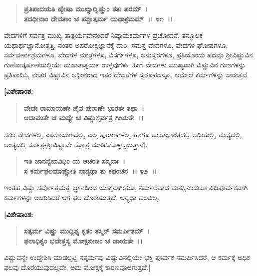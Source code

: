\begin{verse}
\textbf{ಪ್ರತಿಪಾದಯತಿ ಹ್ಯೇಷಾ ಮುಖ್ಯಾದ್ವಿಷ್ಣುಂ ತತಃ ಪರಮ್~।}\\\textbf{ತದಧೀನಾಂ ದೇವತಾಂ ಚ ಪಶ್ಚಾತ್ಕರ್ಮ ಯಥಾಕ್ರಮಮ್~।। ೪೧~।।}
\end{verse}

ವೇದಗಳಿಗೆ ಸರ್ವತ್ರ ಮುಖ್ಯ ತಾತ್ಪರ್ಯವೇನೆಂದರೆ ನಿಷ್ಕಾಮಕರ್ಮಗಳ ಪ್ರಚೋದನೆ, ತನ್ಮೂಲಕ ಯಥಾರ್ಥಜ್ಞಾನೋತ್ಪತ್ತಿ, ನಂತರ ಅಪರೋಕ್ಷಜ್ಞಾನಕ್ಕೆ ದಾರಿ; ಸಮಸ್ತ ವೇದಗಳೂ, ವೇದಗಳ ಘೋಷಗಳೂ, ಸರ್ವವರ್ಣಾಶ್ರಮಗಳೂ, ವೇದಗಳ ಮಾತ್ರೆಗಳೂ, ವಿಸರ್ಗಗಳೂ, ಅನುಸ್ವರಗಳೂ, ಪ್ರತಿಯೊಂದು ಪದವೂ ಶ‍್ರೀವಿಷ್ಣುವಿನ ಗುಣೋತ್ಕರ್ಷಣೆಯಲ್ಲಿಯೇ ಮಹಾತಾತ್ಪರ್ಯ ಉಳ್ಳವುಗಳು. ಹೀಗೆ ವೇದಗಳು ಮುಖ್ಯವಾಗಿ ವಿಷ್ಣುವಿನ ಗುಣಗಳನ್ನು ಪ್ರತಿಪಾದಿಸಿ, ನಂತರ ವಿಷ್ಣುವಿನ ಅಧೀನರಾದ ಇತರ ದೇವತೆಗಳ ಸ್ವರೂಪವನ್ನೂ, ಆಮೇಲೆ ಕರ್ಮಗಳನ್ನು ಸಾರುತ್ತವೆ.

\begin{flushleft}
\textbf{[ವಿಶೇಷಾಂಶ: }
\end{flushleft}

\begin{verse}
\textbf{ವೇದೇ ರಾಮಾಯಣೇ ಚೈವ ಪುರಾಣೇ ಭಾರತೇ ತಥಾ~।}\\\textbf{ಆದಾವಂತೇ ಚ ಮಧ್ಯೇ ಚ ವಿಷ್ಣುಸ್ಸರ್ವತ್ರ ಗೀಯತೇ~।।} 
\end{verse}

ಸಕಲ ವೇದಗಳಲ್ಲಿ, ರಾಮಾಯಣದಲ್ಲಿ, ಎಲ್ಲ ಪುರಾಣಗಳಲ್ಲಿ, ಹಾಗೂ ಮಹಾಭಾರತ\-ದಲ್ಲಿ ಆದಿಯಲ್ಲಿ, ಮಧ್ಯದಲ್ಲಿ, ಅಂತ್ಯದಲ್ಲಿ ಸರ್ವತ್ರ-ಶ‍್ರೀವಿಷ್ಣುವೇ ಸ್ತೋತ್ರ ಮಾಡಿಸಿಕೊಳ್ಳಲ್ಪಡುತ್ತಾನೆ].

\begin{verse}
\textbf{ಇತಿ ಜಾನನ್ವೇದವಿಧಿಂ ಯ ಆಚರತಿ ಸನ್ಮನಾಃ~।}\\\textbf{ಸ ಕರ್ಮಫಲಮಾಪ್ನೋತಿ ನಾನ್ಯಥಾ ತು ಕಥಂಚನ~।। ೪೨~।।}
\end{verse}

ಇಂತಹ ವಿಷ್ಣು ಸರ್ವೋತ್ತಮತ್ವ ಜ್ಞಾನದಿಂದ ಯುಕ್ತನಾಗಿಯೂ, ನಿರ್ಮಲವಾದ ಮನಸ್ಸಿನಿಂದಲೂ ವಿಧಿಪೂರ್ವಕವಾಗಿ ಕರ್ಮಗಳನ್ನು ಆಚರಿಸಿದರೆ ಆಗ ಫಲ ದೊರೆಯುತ್ತದೆ. ಅನ್ಯಥಾ ಫಲವಿಲ್ಲ. 

\newpage

\begin{flushleft}
\textbf{[ವಿಶೇಷಾಂಶ:}
\end{flushleft}

\begin{verse}
\textbf{ಸತ್ಕರ್ಮ ವಿಷ್ಣು ಮುದ್ದಿಶ್ಯ ಕೃತಂ ತಸ್ಮಿನ್ ಸಮರ್ಪಿತಮ್~।}\\\textbf{ಫಲಾಧಿಕ್ಯಂ ಭವೇತ್ತಸ್ಯ ಮೋಕ್ಷಬೀಜಂ ಚ ಜಾಯತೇ~।।} 
\end{verse}

ವಿಷ್ಣುವನ್ನೇ ಉದ್ದೇಶಿಸಿ ಮಾಡಲ್ಪಟ್ಟ ಸತ್ಕರ್ಮವು ವಿಷ್ಣುವಿನಲ್ಲಿಯೇ ಭಕ್ತಿ ಪೂರ್ವಕ ಸಮರ್ಪಿಸಿದರೆ, ಆ ಕರ್ಮಕ್ಕೆ ಅಧಿಕ ಫಲವು ದೊರೆಯುವುದಲ್ಲದೇ, ಅದು ಮೋಕ್ಷಕ್ಕೆ ಕಾರಣವೂ\break ಆಗುತ್ತದೆ.]

